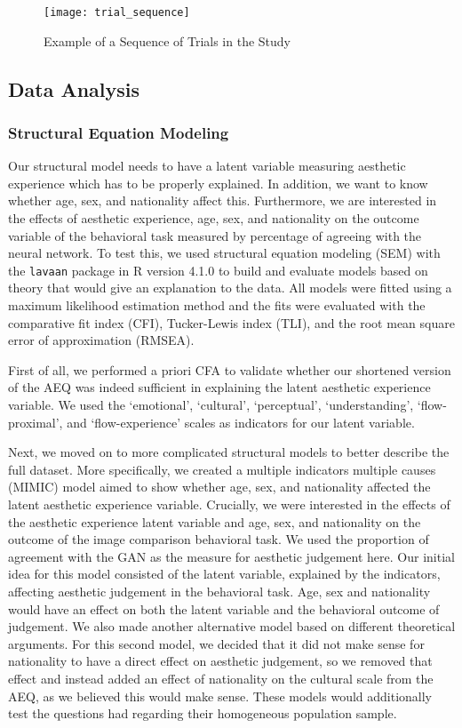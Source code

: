 \documentclass[../main.tex]{subfiles}
\begin{document}
	
	\begin{figure}
		\centering
		\caption{Example of a Sequence of Trials in the Study}
		\label{fig:trial_sequence}
		\texttt{[image: trial\_sequence]}
	\end{figure}

	
	\subsection{Data Analysis}
	\subsubsection{Structural Equation Modeling}
	Our structural model needs to have a latent variable measuring aesthetic experience which has to be properly explained. In addition, we want to know whether age, sex, and nationality affect this. Furthermore, we are interested in the effects of aesthetic experience, age, sex, and nationality on the outcome variable of the behavioral task measured by percentage of agreeing with the neural network. To test this, we used structural equation modeling (SEM) with the \texttt{lavaan} package \parencite{rosseel2012lavaan} in R version 4.1.0 \parencite{rcoreteamlanguage} to build and evaluate models based on theory that would give an explanation to the data. All models were fitted using a maximum likelihood estimation method and the fits were evaluated with the comparative fit index (CFI), Tucker-Lewis index (TLI), and the root mean square error of approximation (RMSEA).
	
	First of all, we performed a priori CFA to validate whether our shortened version of the AEQ was indeed sufficient in explaining the latent aesthetic experience variable. We used the `emotional', `cultural', `perceptual', `understanding', `flow-proximal', and `flow-experience' scales as indicators for our latent variable. 
	
	Next, we moved on to more complicated structural models to better describe the full dataset. More specifically, we created a multiple indicators multiple causes (MIMIC) model aimed to show whether age, sex, and nationality affected the latent aesthetic experience variable. Crucially, we were interested in the effects of the aesthetic experience latent variable and age, sex, and nationality on the outcome of the image comparison behavioral task. We used the proportion of agreement with the GAN as the measure for aesthetic judgement here. Our initial idea for this model consisted of the latent variable, explained by the indicators, affecting aesthetic judgement in the behavioral task. Age, sex and nationality would have an effect on both the latent variable and the behavioral outcome of judgement. We also made another alternative model based on different theoretical arguments. For this second model, we decided that it did not make sense for nationality to have a direct effect on aesthetic judgement, so we removed that effect and instead added an effect of nationality on the cultural scale from the AEQ, as we believed this would make sense. These models would additionally test the questions \textcite{wanzerExperiencingFlowViewing2020} had regarding their homogeneous population sample. 
	
\end{document}
